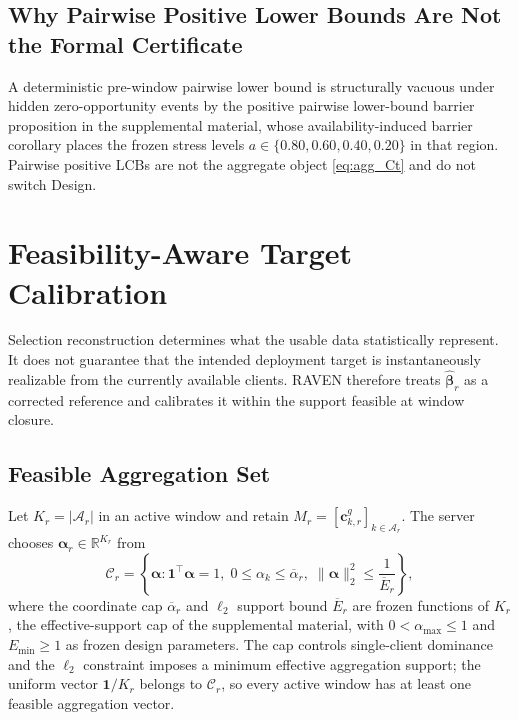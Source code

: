 \documentclass[letterpaper,journal]{IEEEtran}
\begin{document}
\subsection{Why Pairwise Positive Lower Bounds Are Not the Formal Certificate}
\label{subsec:pairwise_barrier}

A deterministic pre-window pairwise lower bound is structurally vacuous under
hidden zero-opportunity events by the positive pairwise lower-bound barrier
proposition in the supplemental material, whose availability-induced barrier
corollary places the frozen stress levels $a\in\{0.80,0.60,0.40,0.20\}$ in that
region.  Pairwise positive LCBs are not the aggregate object \eqref{eq:agg_Ct}
and do not switch Design.


\section{Feasibility-Aware Target Calibration}
\label{sec:calibration}

Selection reconstruction determines what the usable data statistically
represent.  It does not guarantee that the intended deployment target is
instantaneously realizable from the currently available clients.  RAVEN
therefore treats $\widehat{\boldsymbol\beta}_r$ as a corrected reference and
calibrates it within the support feasible at window closure.

\subsection{Feasible Aggregation Set}
\label{subsec:feasible_set}

Let $K_r=|\mathcal{A}_r|$ in an active window and retain
$M_r=[\mathbf{c}^{g}_{k,r}]_{k\in\mathcal{A}_r}$.  The server chooses
$\boldsymbol\alpha_r\in\mathbb{R}^{K_r}$ from
\begin{equation}
 \mathcal{C}_r
 =
 \left\{
 \boldsymbol\alpha:
 \mathbf{1}^{\top}\boldsymbol\alpha=1,\;
 0\le\alpha_k\le\overline\alpha_r,\;
 \|\boldsymbol\alpha\|_2^2\le\frac{1}{\overline E_r}
 \right\},
 \label{eq:Cr}
\end{equation}
where the coordinate cap $\overline\alpha_r$ and $\ell_2$ support bound
$\overline E_r$ are frozen functions of $K_r$, the effective-support cap of the
supplemental material, with $0<\alpha_{\max}\le1$ and $E_{\min}\ge1$ as frozen
design parameters.  The cap controls single-client dominance and the $\ell_2$
constraint imposes a minimum effective aggregation support; the uniform vector
$\mathbf{1}/K_r$ belongs to $\mathcal{C}_r$, so every active window has at least
one feasible aggregation vector.
\end{document}

